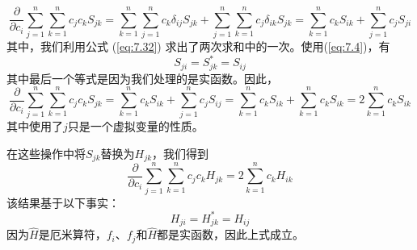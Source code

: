     \begin{equation*}
        \frac{\partial}{\partial c_i}\sum_{j=1}^{n}\sum_{k=1}^{n} c_jc_kS_{jk} = \sum_{k=1}^{n}\sum_{j=1}^{n}c_k\delta_{ij}S_{jk} + \sum_{j=1}^{n}\sum_{k=1}^{n}c_j\delta_{ik}S_{jk} = \sum_{k=1}^{n}c_kS_{ik} + \sum_{j=1}^{n}c_jS_{ji}
    \end{equation*}
    其中，我们利用公式 (\ref{eq:7.32}) 求出了两次求和中的一次。使用(\ref{eq:7.4})，有
    \begin{equation}
        S_{ji} = S_{jk}^{\ast} = S_{ij}
        \label{eq:8.49}
    \end{equation}
    其中最后一个等式是因为我们处理的是实函数。因此，
    \begin{equation}
        \frac{\partial}{\partial c_i}\sum_{j=1}^{n}\sum_{k=1}^{n}c_jc_kS_{jk} = \sum_{k=1}^{n}c_kS_{ik} + \sum_{j=1}^{n}c_jS_{ij} = \sum_{k=1}^{n}c_kS_{ik} + \sum_{k=1}^{n}c_kS_{ik} = 2\sum_{k=1}^{n}c_kS_{ik}
        \label{eq:8.50}
    \end{equation}
    其中使用了$j$只是一个虚拟变量的性质。

    在这些操作中将$S_{jk}$替换为$H_{jk}$，我们得到
    \begin{equation}
        \frac{\partial}{\partial c_i}\sum_{j=1}^{n}\sum_{k=1}^{n}c_jc_kH_{jk} = 2\sum_{k=1}^{n}c_kH_{ik}
        \label{eq:8.51}
    \end{equation}
    该结果基于以下事实：
    \begin{equation}
        H_{ji} = H_{jk}^{\ast} = H_{ij}
        \label{eq:8.52}
    \end{equation}
    因为$\hat{H}$是厄米算符，$f_i$、$f_j$和$\hat{H}$都是实函数，因此上式成立。

